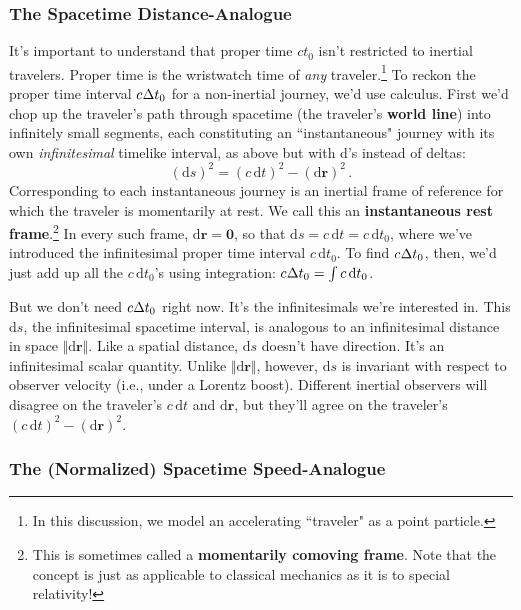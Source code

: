 \documentclass[12pt]{article}
\renewcommand{\vv}[1]{\mathbf{#1}}
\newcommand{\dd}[1]{\mathrm{d}#1}
\begin{document}
\subsubsection{The Spacetime Distance-Analogue}\label{sssec:ds}

It's important to understand that proper time $ct_0$ isn't restricted to inertial travelers. Proper time is the wristwatch time of \emph{any} traveler.\footnote{\label{fn:tr}In this discussion, we model an accelerating ``traveler" as a point particle.} To reckon the proper time interval $c \mkern.5mu \Delta t_0$ for a non-inertial journey, we'd use calculus. First we'd chop up the traveler's path through spacetime (the traveler's \textbf{world line}) into infinitely small segments, each constituting an ``instantaneous" journey with its own \emph{infinitesimal} timelike interval, as above but with d's instead of deltas:
\begin{equation}\label{eq:24}
\boxed{(\dd s)^2 =(c \, \dd t)^2 - (\dd \vv r)^2} \, .
\end{equation}
Corresponding to each instantaneous journey is an inertial frame of reference for which the traveler is momentarily at rest. We call this an \textbf{instantaneous rest frame}.\footnote{This is sometimes called a \textbf{momentarily comoving frame}. Note that the concept is just as applicable to classical mechanics as it is to special relativity!} In every such frame, $\dd \vv r = \vv 0$, so that $\dd s = c \,\dd t = c \, \dd t_0$, where we've introduced the infinitesimal proper time interval $c \, \dd t_0$. To find $c \mkern.5mu \Delta t_0$, then, we'd just add up all the $c \, \dd t_0$'s using integration: $c \mkern.5mu \Delta t_0 = \int c \, \dd t_0$.

But we don't need $c \mkern.5mu \Delta t_0$ right now. It's the infinitesimals we're interested in. This $\dd s$, the infinitesimal spacetime interval, is analogous to an infinitesimal distance in space $\Vert \dd \vv r \Vert$. Like a spatial distance, $\dd s$ doesn't have direction. It's an infinitesimal scalar quantity. Unlike $\Vert \dd \vv r \Vert$, however, $\dd s$ is invariant with respect to observer velocity (i.e., under a Lorentz boost). Different inertial observers will disagree on the traveler's $c \, \dd t$ and $\dd \vv r$, but they'll agree on the traveler's $(c \, \dd t)^2 - (\dd \vv r)^2$.

\subsubsection{The (Normalized) Spacetime Speed-Analogue}\label{sssec:b}
\end{document}
